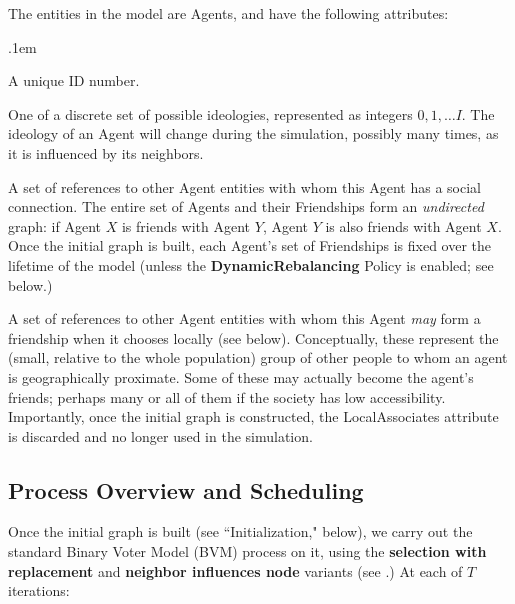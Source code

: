 The entities in the model are Agents, and have the following attributes:

\begin{description}
\itemsep.1em
\item[ID] A unique ID number.

\item[Ideology] One of a discrete set of possible ideologies, represented as
integers $0, 1, \dots I$. The ideology of an Agent will change during the
simulation, possibly many times, as it is influenced by its neighbors.

\item[Friendships] A set of references to other Agent entities with whom this
Agent has a social connection. The entire set of Agents and their Friendships
form an \textit{undirected} graph: if Agent $X$ is friends with Agent $Y$,
Agent $Y$ is also friends with Agent $X$.  Once the initial graph is built,
each Agent's set of Friendships is fixed over the lifetime of the model
(unless the \textbf{DynamicRebalancing} Policy is enabled; see below.)

\item[LocalAssociates] A set of references to other Agent entities with whom
this Agent \textit{may} form a friendship when it chooses locally (see below).
Conceptually, these represent the (small, relative to the whole population)
group of other people to whom an agent is geographically proximate. Some of
these may actually become the agent's friends; perhaps many or all of them if
the society has low accessibility. Importantly, once the initial graph is
constructed, the LocalAssociates attribute is discarded and no longer used in
the simulation.

\end{description}



\subsection{Process Overview and Scheduling}
\label{sec:BVM}

Once the initial graph is built (see ``Initialization," below), we carry out
the standard Binary Voter Model (BVM) process on it, using the
\textbf{selection with replacement} and \textbf{neighbor influences node}
variants (see \cite{davies_computational_2016}.) At each of $T$ iterations:

